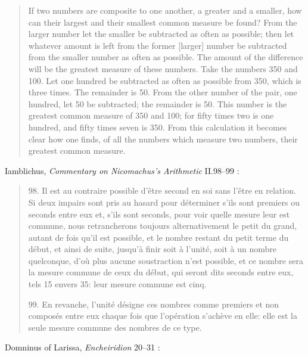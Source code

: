 \documentclass{article}
\begin{document}
\begin{quote}
If two numbers are composite to one another, a greater and
a smaller, how can their largest and their smallest common measure
be found? From the larger number let the smaller be subtracted
as often as possible; then let whatever amount is left from the
former [larger] number be subtracted from the smaller number
as often as possible. The amount of the difference will be the
greatest measure of these numbers. Take the numbers 350 and 100. Let
one hundred be subtracted as often as possible from 350, which is
three times. The remainder is 50. From the other number of the pair,
one hundred, let 50 be subtracted; the remainder is 50. This number
is the greatest common measure of 350 and 100; for fifty times two
is one hundred, and fifty times seven is 350. From this calculation
it becomes clear how one finds, of all the numbers which measure
two numbers, their greatest common measure.
\end{quote}

Iamblichus,  {\em Commentary on Nicomachus's Arithmetic} II.98--99 \cite[p.~97]{iamblichus}:

\begin{quote}
98. Il est au contraire possible d'\^{e}tre second en soi sans l'\^{e}tre en relation.
Si deux impairs sont pris au hasard pour d\'eterminer s'ils sont
premiers ou seconds entre eux et, s'ils sont seconds, pour voir quelle
mesure leur est commune, nous retrancherons toujours alternativement le petit
du grand, autant de fois qu'il est possible, et le nombre restant du petit terme du d\'ebut,
et ainsi de suite, jusqu'\`a finir soit \`a l'unit\'e, soit \`a un nombre quelconque, d'o\`u plus  aucune
soustraction n'est possible, et ce nombre sera la mesure commune de ceux du d\'ebut,
qui seront dits seconds entre eux, tels 15 envers 35: leur mesure commune est cinq.

99. En revanche, l'unit\'e d\'esigne ces nombres comme premiers et non compos\'es entre
eux chaque fois que l'op\'eration s'ach\`eve en elle: elle est la seule mesure commune
des nombres de ce type.
\end{quote}

Domninus of Larissa, {\em Encheiridion} 20--31  \cite[pp.~111--115]{domninus}:
\end{document}
